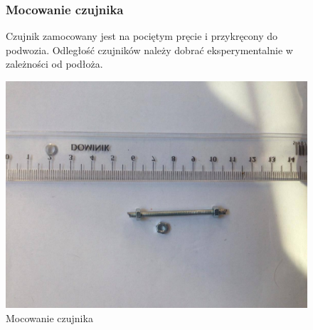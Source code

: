 \documentclass[a4paper,11pt]{article}
\def\SCALE{0.6}
\begin{document}
\begin{figure}[H]
	\subsubsection{Mocowanie czujnika}
	Czujnik zamocowany jest na pociętym pręcie i przykręcony do podwozia. Odległość czujników należy dobrać eksperymentalnie w zależności od podłoża.	
	
	\centering
	\includegraphics[width=\SCALE
	\paperwidth]{mocowanieCzujnika}
	\caption{Mocowanie czujnika}

\end{figure}
\end{document}
